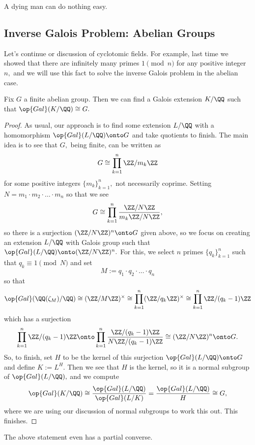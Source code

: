 












A dying man can do nothing easy.

\subsection{Inverse Galois Problem: Abelian Groups}
Let's continue or discussion of cyclotomic fields. For example, last time we showed that there are infinitely many primes $1\pmod n$ for any positive integer $n,$ and we will use this fact to solve the inverse Galois problem in the abelian case.
\begin{proposition}
	Fix $G$ a finite abelian group. Then we can find a Galois extension $K/\QQ$ such that $\op{Gal}(K/\QQ)\cong G.$
\end{proposition}
\begin{proof}
	As usual, our approach is to find some extension $L/\QQ$ with a homomorphism $\op{Gal}(L/\QQ)\onto G$ and take quotients to finish. The main idea is to see that $G,$ being finite, can be written as
	\[G\cong\prod_{k=1}^n\ZZ/m_k\ZZ\]
	for some positive integers $\{m_k\}_{k=1}^n,$ not necessarily coprime. Setting $N=m_1\cdot m_2\cdot\ldots\cdot m_n$ so that we see
	\[G\cong\prod_{k=1}^n\frac{\ZZ/N\ZZ}{m_k\ZZ/N\ZZ},\]
	so there is a surjection $(\ZZ/N\ZZ)^n\onto G$ given above, so we focus on creating an extension $L/\QQ$ with Galois group such that $\op{Gal}(L/\QQ)\onto(\ZZ/N\ZZ)^n.$ For this, we select $n$ primes $\{q_k\}_{k=1}^n$ such that $q_k\equiv1\pmod N$ and set
	\[M:=q_1\cdot q_2\cdot\ldots\cdot q_n\]
	so that
	\[\op{Gal}(\QQ(\zeta_M)/\QQ)\cong(\ZZ/M\ZZ)^\times\cong\prod_{k=1}^n(\ZZ/q_k\ZZ)^\times\cong\prod_{k=1}^n\ZZ/(q_k-1)\ZZ\]
	which has a surjection
	\[\prod_{k=1}^n\ZZ/(q_k-1)\ZZ\onto\prod_{k=1}^n\frac{\ZZ/(q_k-1)\ZZ}{N\ZZ/(q_k-1)\ZZ}\cong(\ZZ/N\ZZ)^n\onto G.\]
	So, to finish, set $H$ to be the kernel of this surjection $\op{Gal}(L/\QQ)\onto G$ and define $K:=L^H.$ Then we see that $H$ is the kernel, so it is a normal subgroup of $\op{Gal}(L/\QQ),$ and we compute
	\[\op{Gal}(K/\QQ)\cong\frac{\op{Gal}(L/\QQ)}{\op{Gal}(L/K)}=\frac{\op{Gal}(L/\QQ)}H\cong G,\]
	where we are using our discussion of normal subgroups to work this out. This finishes.
\end{proof}
The above statement even has a partial converse.
